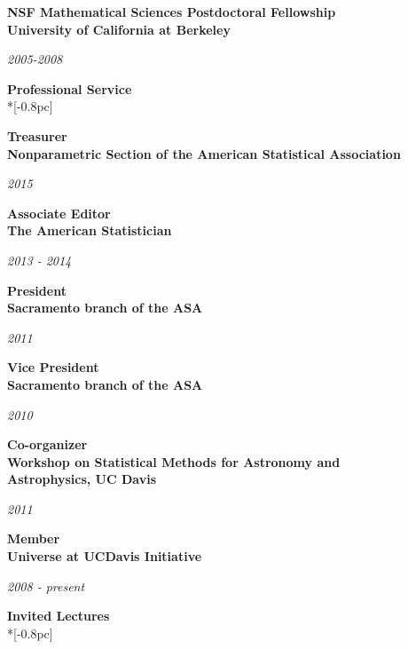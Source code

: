 \documentclass[11pt]{article}
\newcommand{\head}[1]{
  \vspace{10pt}
  {\Large \bf #1} \\*[-0.8pc]
  \underline{\hspace{6.07in}}}
\newcommand{\datedentry}[2]{
  \vspace{5pt}
  \begin{minipage}{5in}{\textbf{#1}}\end{minipage}
  \hfill
  \begin{minipage}{1in}{\hfill\textit{#2}}\end{minipage}
  }
\begin{document}
\vspace{9pt}

\datedentry{NSF Mathematical Sciences Postdoctoral Fellowship\\
University of California at Berkeley}{2005-2008}


\head{Professional Service}


\datedentry{Treasurer\\ Nonparametric Section of the American Statistical Association}{2015}

\vspace{7pt}


\datedentry{Associate Editor\\ The American Statistician}{2013 - 2014}

\vspace{7pt}

\datedentry{President\\ Sacramento branch of the ASA}{2011}

\vspace{7pt}

\datedentry{Vice President\\ Sacramento branch of the ASA}{2010}

\vspace{7pt}

\datedentry{Co-organizer\\  Workshop on Statistical Methods for Astronomy and\\ Astrophysics, UC Davis}{2011}

\vspace{7pt}

\datedentry{Member\\ Universe at UCDavis Initiative}{2008 - present}


\vspace{5pt}
\head{Invited Lectures}
\end{document}
